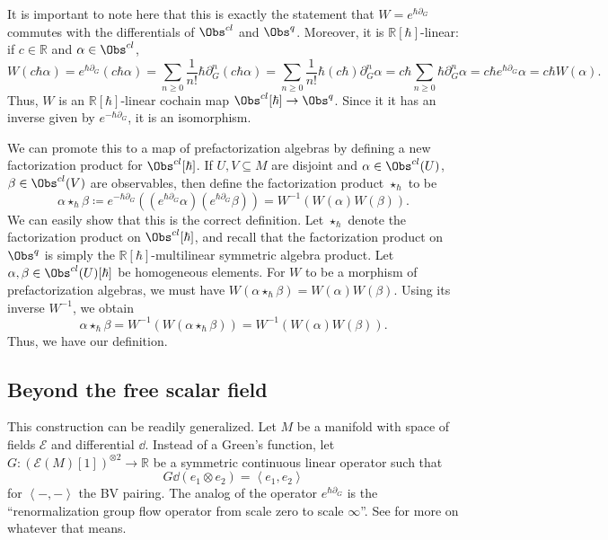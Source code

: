 It is important to note here that this is exactly the statement that $W=e^{\hbar \partial _G} $ commutes with the differentials of $\Obs^{cl} $ and $\Obs^{q} $. Moreover, it is $\mathbb{R} [\hbar ]$-linear: if $c\in\mathbb{R} $ and $\alpha \in \Obs^{cl} $,
\[
	W(c\hbar \alpha ) = e^{\hbar \partial _G} (c\hbar \alpha ) = \sum_{n\geq 0} \frac{1}{n!} \hbar \partial _G^n(c\hbar \alpha )=\sum_{n\geq 0} \frac{1}{n!} \hbar (c\hbar)\partial _G^n\alpha =c\hbar \sum_{n\geq 0} \hbar \partial _G^n\alpha =c\hbar e^{\hbar \partial _G} \alpha =c\hbar W(\alpha )
.\]
Thus, $W$ is an $\mathbb{R} [\hbar ]$-linear cochain map $\Obs^{cl} [\hbar ]\to \Obs^{q} $. Since it it has an inverse given by $e^{-\hbar \partial _G}$, it is an isomorphism.

We can promote this to a map of prefactorization algebras by defining a new factorization product for $\Obs^{cl} [\hbar ]$. If $U,V\subseteq M$ are disjoint and $\alpha \in \Obs^{cl} (U)$, $\beta \in \Obs^{cl} (V)$ are observables, then define the factorization product $\star _{\hbar } $ to be
\[
	\alpha \star _{\hbar } \beta \coloneqq e^{-\hbar \partial _G} \left( \left( e^{\hbar \partial _G} \alpha  \right) \left( e^{\hbar \partial _G} \beta  \right)  \right) = W^{-1} (W(\alpha )W(\beta ))
.\]
We can easily show that this is the correct definition. Let $\star _{\hbar } $ denote the factorization product on $\Obs^{cl} [\hbar ]$, and recall that the factorization product on $\Obs^{q} $ is simply the $\mathbb{R} [\hbar ]$-multilinear symmetric algebra product. Let $\alpha ,\beta \in \Obs^{cl}(U)[\hbar ]$ be homogeneous elements. For $W$ to be a morphism of prefactorization algebras, we must have $W(\alpha \star _\hbar \beta )=W(\alpha )W(\beta )$. Using its inverse $W^{-1} $, we obtain
\[
	\alpha \star _{\hbar } \beta =  W^{-1} (W(\alpha \star _{\hbar } \beta )) = W^{-1} (W(\alpha )W(\beta ))
.\]
Thus, we have our definition.

\subsection{Beyond the free scalar field}

This construction can be readily generalized. Let $M$ be a manifold with space of fields $\mathcal{E} $ and differential $\dd $. Instead of a Green's function, let $G : (\mathcal{E} (M)[1])^{\otimes 2}  \to \mathbb{R} $ be a symmetric continuous linear operator such that
\[
	G\dd (e_1\otimes e_2)=\left\langle e_1,e_2 \right\rangle 
\]
for $\left\langle -,- \right\rangle $ the BV pairing. The analog of the operator $e^{\hbar \partial _G} $ is the ``renormalization group flow operator from scale zero to scale $\infty $''. See \cite{costello-renormalization} for more on whatever that means.



